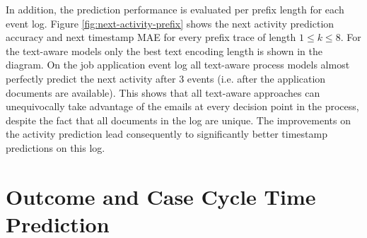 In addition, the prediction performance is evaluated per prefix length for each event log.
Figure \ref{fig:next-activity-prefix} shows the next activity prediction accuracy and next timestamp MAE for every prefix trace of length $1 \leq k \leq 8$.
For the text-aware models only the best text encoding length is shown in the diagram.
On the job application event log all text-aware process models almost perfectly predict the next activity after 3 events (i.e. after the application documents are available).
This shows that all text-aware approaches can unequivocally take advantage of the emails at every decision point in the process, despite the fact that all documents in the log are unique.
The improvements on the activity prediction lead consequently to significantly better timestamp predictions on this log.



\section{Outcome and Case Cycle Time Prediction}

